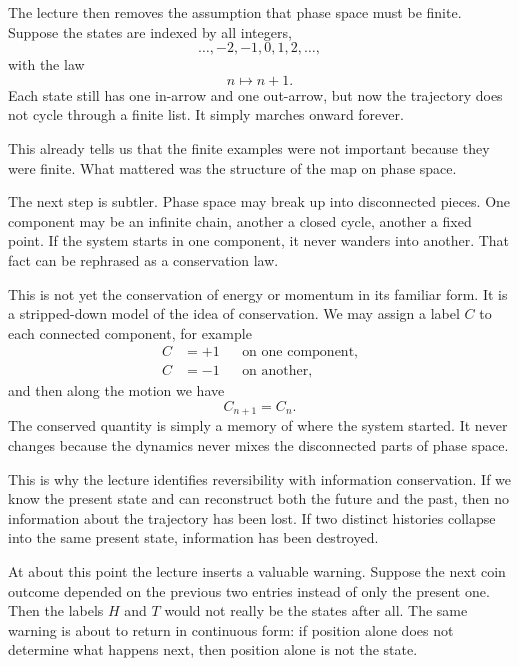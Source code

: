 The lecture then removes the assumption that phase space must be finite. Suppose the states are indexed by all integers,
\[
\ldots,-2,-1,0,1,2,\ldots,
\]
with the law
\begin{equation}
n\mapsto n+1.
\end{equation}
Each state still has one in-arrow and one out-arrow, but now the trajectory does not cycle through a finite list. It simply marches onward forever.

This already tells us that the finite examples were not important because they were finite. What mattered was the structure of the map on phase space.

The next step is subtler. Phase space may break up into disconnected pieces. One component may be an infinite chain, another a closed cycle, another a fixed point. If the system starts in one component, it never wanders into another. That fact can be rephrased as a conservation law.

This is not yet the conservation of energy or momentum in its familiar form. It is a stripped-down model of the idea of conservation. We may assign a label \(C\) to each connected component, for example
\begin{equation}
\begin{aligned}
C&=+1 &&\text{on one component},\\
C&=-1 &&\text{on another},
\end{aligned}
\end{equation}
and then along the motion we have
\begin{equation}
C_{n+1}=C_n.
\end{equation}
The conserved quantity is simply a memory of where the system started. It never changes because the dynamics never mixes the disconnected parts of phase space.

This is why the lecture identifies reversibility with information conservation. If we know the present state and can reconstruct both the future and the past, then no information about the trajectory has been lost. If two distinct histories collapse into the same present state, information has been destroyed.

At about this point the lecture inserts a valuable warning. Suppose the next coin outcome depended on the previous two entries instead of only the present one. Then the labels \(H\) and \(T\) would not really be the states after all. The same warning is about to return in continuous form: if position alone does not determine what happens next, then position alone is not the state.


